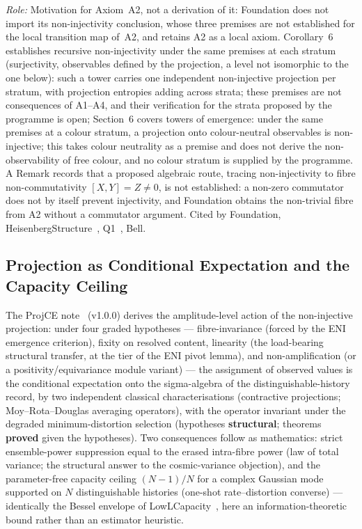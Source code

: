 \documentclass[11pt,a4paper]{article}
\newcommand{\sproved}{\textcolor{cproved}{\textbf{proved}}}
\newcommand{\sstruct}{\textcolor{cstruct}{\textbf{structural}}}
\begin{document}
    \textit{Role:} Motivation for Axiom~A2, not a derivation of it: Foundation does not import its non-injectivity
    conclusion, whose three premises are not established for the local transition map of~A2, and retains A2 as a local axiom.
    Corollary~6 establishes recursive non-injectivity under the same premises at each stratum (surjectivity,
    observables defined by the projection, a level not isomorphic to the one below): such a tower carries one
    independent non-injective projection per stratum, with projection entropies adding across strata; these
    premises are not consequences of A1--A4, and their verification for the strata proposed by the programme is
    open;
    Section~6 covers towers of emergence: under the same premises at a colour stratum, a projection onto
    colour-neutral observables is non-injective; this takes colour neutrality as a premise and does not derive the
    non-observability of free colour, and no colour stratum is supplied by the programme.
    A Remark records that a proposed algebraic route, tracing non-injectivity to fibre non-commutativity
    $[X,Y]=Z\neq 0$, is not established: a non-zero commutator does not by itself prevent injectivity, and
    Foundation obtains the non-trivial fibre from A2 without a commutator argument.
    Cited by Foundation, HeisenbergStructure~\cite{Beau2026HeisenbergStructure},
    Q1~\cite{Beau2026q1}, Bell.

  \subsection{Projection as Conditional Expectation and the Capacity Ceiling}

    The ProjCE note~\cite{Beau2026pce} (v1.0.0) derives the amplitude-level action of the non-injective
    projection: under four graded hypotheses --- fibre-invariance (forced by the ENI emergence
    criterion), fixity on resolved content, linearity (the load-bearing structural transfer, at the tier
    of the ENI pivot lemma), and non-amplification (or a positivity/equivariance module variant) --- the
    assignment of observed values is the conditional expectation onto the sigma-algebra of the
    distinguishable-history record, by two independent classical characterisations (contractive
    projections; Moy--Rota--Douglas averaging operators), with the operator invariant under the degraded
    minimum-distortion selection (hypotheses \sstruct; theorems \sproved{} given the hypotheses).
    Two consequences follow as mathematics: strict ensemble-power suppression equal to the erased
    intra-fibre power (law of total variance; the structural answer to the cosmic-variance objection),
    and the parameter-free capacity ceiling $(N-1)/N$ for a complex Gaussian mode supported on $N$
    distinguishable histories (one-shot rate--distortion converse) --- identically the Bessel envelope of
    LowLCapacity~\cite{Beau2026dhc}, here an information-theoretic bound rather than an estimator heuristic.
\end{document}
